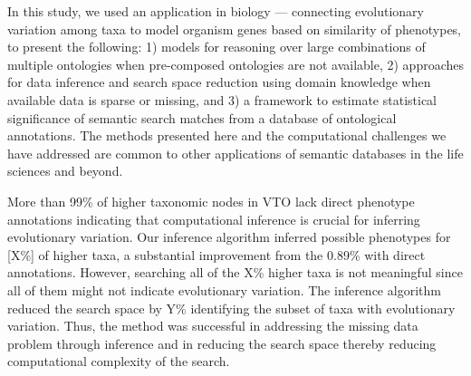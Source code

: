 \documentclass{article}
\begin{document}

In this study, we used an application in biology — connecting evolutionary variation among taxa to model organism genes based on similarity of phenotypes, to present the following: 1) models for reasoning over large combinations of multiple ontologies when pre-composed ontologies are not available, 2) approaches for data inference and search space reduction using domain knowledge when available data is sparse or missing, and 3) a framework to estimate statistical significance of semantic search matches from a database of ontological annotations. The methods presented here and the computational challenges we have addressed are common to other applications of semantic databases in the life sciences and beyond.




More than 99\% of higher taxonomic nodes in VTO lack direct phenotype annotations indicating that computational inference is crucial for inferring evolutionary variation. Our inference algorithm inferred possible phenotypes for [X\%] of higher taxa, a substantial improvement from the 0.89\% with direct annotations. However, searching all of the X\% higher taxa is not meaningful since all of them might not indicate evolutionary variation. The inference algorithm reduced the search space by Y\% identifying the subset of taxa with evolutionary variation. Thus, the method was successful in addressing the missing data problem through inference and in reducing the search space thereby reducing computational complexity of the search.
\end{document}
